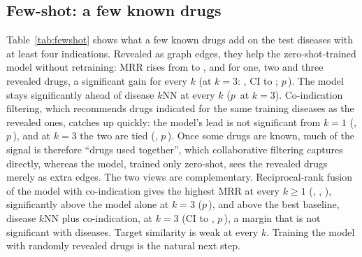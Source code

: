 \documentclass{ieeeaccess}
\newcommand{\sysname}{BioPathNet++\xspace}
\begin{document}
\subsection{Few-shot: a few known drugs}
\label{sec:fewshot}
Table~\ref{tab:fewshot} shows what a few known drugs add on the \FsN{} test diseases with at least four indications. Revealed as graph edges, they help the zero-shot-trained model without retraining: MRR rises from \FsBppZeroMrr{} to \FsBppOneMrr, \FsBppTwoMrr{} and \FsBppThreeMrr{} for one, two and three revealed drugs, a significant gain for every $k$ (at $k=3$: \FsBppGainThree, CI \FsBppGainLoThree{} to \FsBppGainHiThree; $p$\,\FsBppGainPThree). The model stays significantly ahead of disease $k$NN at every $k$ ($p$\,\FsPBppKnnThree{} at $k=3$). Co-indication filtering, which recommends drugs indicated for the same training diseases as the revealed ones, catches up quickly: the model's lead is not significant from $k=1$ (\FsDiffBppCoindOne, $p$\,\FsPBppCoindOne), and at $k=3$ the two are tied (\FsDiffBppCoindThree, $p$\,\FsPBppCoindThree). Once some drugs are known, much of the signal is therefore ``drugs used together'', which collaborative filtering captures directly, whereas the model, trained only zero-shot, sees the revealed drugs merely as extra edges. The two views are complementary. Reciprocal-rank fusion of the model with co-indication gives the highest MRR at every $k\geq1$ (\FsRrfOneMrr, \FsRrfTwoMrr, \FsRrfThreeMrr), significantly above the model alone at $k=3$ ($p$\,\FsPBppRrfThree), and \FsDiffRrfKnnCoindThree{} above the best baseline, disease $k$NN plus co-indication, at $k=3$ (CI \FsDiffLoRrfKnnCoindThree{} to \FsDiffHiRrfKnnCoindThree, $p$\,\FsPRrfKnnCoindThree), a margin that is not significant with \FsN{} diseases. Target similarity is weak at every $k$. Training the model with randomly revealed drugs is the natural next step.

\begin{table}[!t]
\centering
\caption{Few-shot ranking on the \FsN{} test diseases with $\geq$4 indications: MRR on the same held-back indications after revealing $k$ known drugs (\FsDraws{} random draws; \sysname averaged over \TestSeeds{} seeds, not retrained). Columns: MRR for $k$ revealed drugs; H@10 at $k$=3. Best per column in bold.}
\label{tab:fewshot}
\scriptsize
\setlength{\tabcolsep}{2.5pt}

\end{table}
\end{document}
